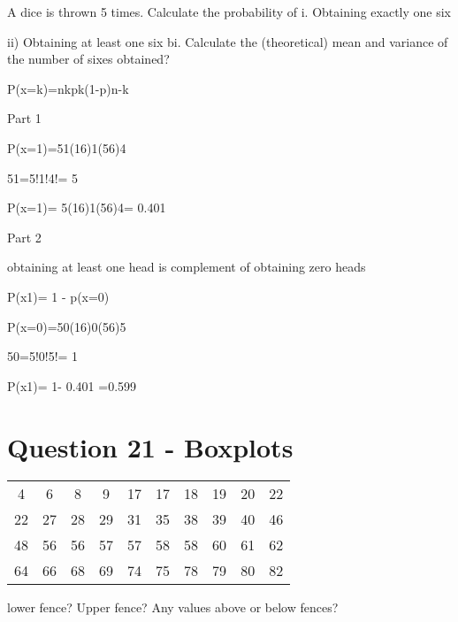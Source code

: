 \documentclass[]{report}
\begin{document}
A dice is thrown 5 times. Calculate the probability of
i.
Obtaining exactly one six


ii)    Obtaining at least one six
bi.
Calculate the (theoretical) mean and variance of the number of sixes obtained?



P(x=k)=nkpk(1-p)n-k






Part 1 


P(x=1)=51(16)1(56)4


51=5!1!4!= 5


P(x=1)= 5(16)1(56)4= 0.401 




Part 2


obtaining at least one head is complement of obtaining zero heads


P(x1)= 1 - p(x=0)



P(x=0)=50(16)0(56)5


50=5!0!5!= 1


P(x1)= 1- 0.401 =0.599 












\section*{Question 21 - Boxplots}
\begin{center}
	\begin{tabular}{|c|c|c|c|c|c|c|c|c|c|}
		4 & 6 & 8 & 9 & 17 & 17 & 18 & 19 & 20 & 22 \\
		22 & 27 & 28 & 29 & 31 & 35 & 38 & 39 & 40 & 46 \\
		48 & 56 & 56 & 57 & 57 & 58 & 58 & 60 & 61 & 62 \\
		64 & 66 & 68 & 69 & 74 & 75 & 78 & 79 & 80 & 82 \\
	\end{tabular} 
	
\end{center}

lower fence?
Upper fence?
Any values above or below fences?
\end{document}
